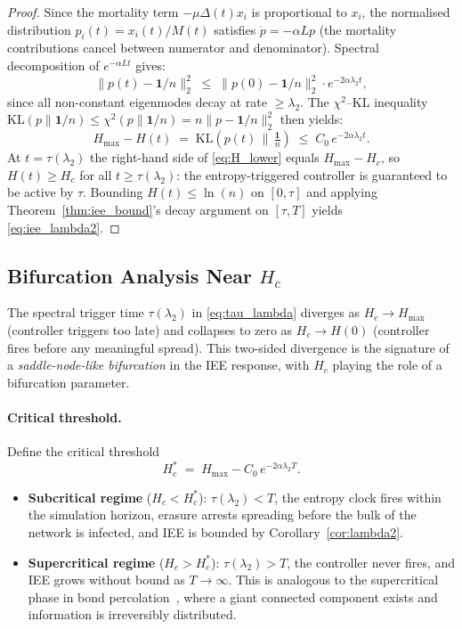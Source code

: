 \documentclass[review,12pt]{elsarticle}
\newcommand{\Hc}{H_c}
\newcommand{\Hmax}{H_{\max}}
\newcommand{\lambdat}{\lambda_2}
\begin{document}
\begin{proof}
Since the mortality term $-\mu\Delta(t)x_i$ is proportional to $x_i$,
the normalised distribution $p_i(t) = x_i(t)/M(t)$ satisfies
$\dot{p} = -\alpha Lp$ (the mortality contributions cancel between
numerator and denominator).  Spectral decomposition of $e^{-\alpha Lt}$
gives:
\[
  \|p(t) - \mathbf{1}/n\|_2^2 \;\leq\; \|p(0) - \mathbf{1}/n\|_2^2
    \cdot e^{-2\alpha\lambdat t},
\]
since all non-constant eigenmodes decay at rate $\geq \lambda_2$.
The $\chi^2$--KL inequality $\mathrm{KL}(p\|\mathbf{1}/n) \leq \chi^2(p\|\mathbf{1}/n)
= n\|p - \mathbf{1}/n\|_2^2$ then yields:
\begin{equation}
  \Hmax - H(t) \;=\; \mathrm{KL}\!\left(p(t)\,\Big\|\,\tfrac{\mathbf{1}}{n}\right)
  \;\leq\; C_0\,e^{-2\alpha\lambdat t}.
  \label{eq:H_lower}
\end{equation}
At $t = \tau(\lambdat)$ the right-hand side of \eqref{eq:H_lower} equals
$\Hmax - \Hc$, so $H(t) \geq \Hc$ for all $t \geq \tau(\lambdat)$:
the entropy-triggered controller is guaranteed to be active by $\tau$.
Bounding $H(t) \leq \ln(n)$ on $[0,\tau]$ and applying
Theorem~\ref{thm:iee_bound}'s decay argument on $[\tau, T]$ yields
\eqref{eq:iee_lambda2}.
\end{proof}

\subsection{Bifurcation Analysis Near $\Hc$}
\label{sec:bifurcation}

The spectral trigger time $\tau(\lambdat)$ in \eqref{eq:tau_lambda}
diverges as $\Hc \to \Hmax$ (controller triggers too late) and collapses
to zero as $\Hc \to H(0)$ (controller fires before any meaningful spread).
This two-sided divergence is the signature of a \emph{saddle-node-like
bifurcation} in the IEE response, with $\Hc$ playing the role of a
bifurcation parameter.

\paragraph{Critical threshold.}
Define the critical threshold
\begin{equation}
  \Hc^* \;=\; \Hmax - C_0\,e^{-2\alpha\lambdat T}.
  \label{eq:hc_star}
\end{equation}
\begin{itemize}
  \item \textbf{Subcritical regime} ($\Hc < \Hc^*$): $\tau(\lambdat) < T$, the
    entropy clock fires within the simulation horizon, erasure arrests spreading
    before the bulk of the network is infected, and IEE is bounded by
    Corollary~\ref{cor:lambda2}.
  \item \textbf{Supercritical regime} ($\Hc > \Hc^*$): $\tau(\lambdat) > T$,
    the controller never fires, and IEE grows without bound as $T\to\infty$.
    This is analogous to the supercritical phase in bond
    percolation~\cite{bollobas2006percolation}, where a giant connected
    component exists and information is irreversibly distributed.
\end{itemize}
\end{document}
